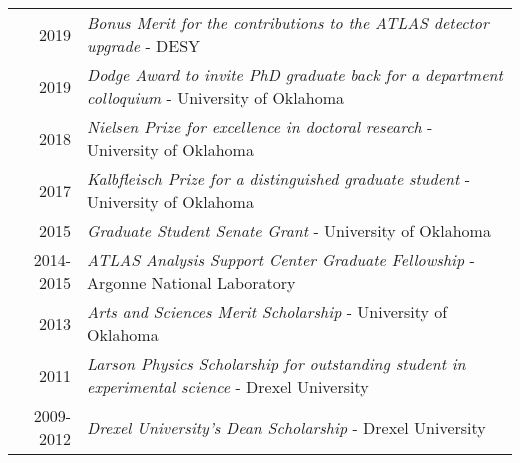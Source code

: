 \documentclass[a4paper,10pt]{article}
\begin{document}
\begin{tabular}{rp{15.5cm}}
\textsc{2019}		    & {\em Bonus Merit for the contributions to the ATLAS detector upgrade} - DESY\\
\textsc{2019}		    & {\em Dodge Award to invite PhD graduate back for a department colloquium} - University of Oklahoma\\
\textsc{2018}		    & {\em Nielsen Prize for excellence in doctoral research} - University of Oklahoma\\
\textsc{2017}		    & {\em Kalbfleisch Prize for a distinguished graduate student} - University of Oklahoma\\
\textsc{2015}		    & {\em Graduate Student Senate Grant} - University of Oklahoma\\
\textsc{2014-2015}		& {\em ATLAS Analysis Support Center Graduate Fellowship} - Argonne National Laboratory\\
\textsc{2013}		    & {\em Arts and Sciences Merit Scholarship} - University of Oklahoma\\
\textsc{2011}		    & {\em Larson Physics Scholarship for outstanding student in experimental science} - Drexel University\\
\textsc{2009-2012}		& {\em Drexel University's Dean Scholarship} - Drexel University\\
\end{tabular}
\end{document}
